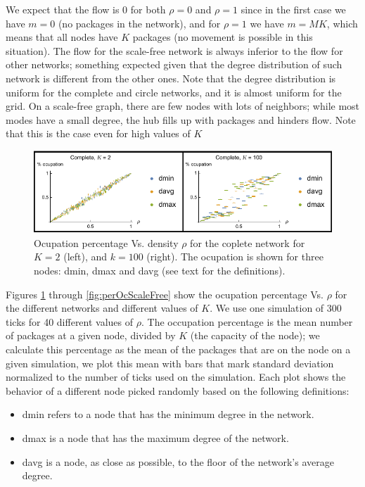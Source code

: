 \documentclass[12pt]{article}
\begin{document}
We expect that the flow is 0 for both $\rho = 0$ and $\rho =1$ since in the first case we have $m=0$ (no packages in the network), and for $\rho = 1$ we have $m = M K$, which means that all nodes have $K$ packages (no movement is possible in this situation).
The flow for the scale-free network is always inferior to the flow for other networks; something expected given that the degree distribution of such network is different from the other ones.
Note that the degree distribution is uniform for the complete and circle networks, and it is almost uniform for the grid.
On a scale-free graph, there are few nodes with lots of neighbors; while most modes have a small degree, the hub fills up with packages and hinders flow.
Note that this is the case even for high values of $K$

\begin{figure}[!hbt]
  \centering
  \includegraphics[width=\textwidth]{plots/ocupationVarianceComplet.pdf}
  \caption{Ocupation percentage Vs. density $\rho$ for the coplete network for $K=2$ (left), and $k=100$ (right). 
    The ocupation is shown for three nodes: dmin, dmax and davg (see text for the definitions).}
  \label{fig:perOcComplete}
\end{figure}

Figures \ref{fig:perOcComplete} through \ref{fig:perOcScaleFree} show the ocupation percentage Vs. $\rho$ for the different networks and different values of $K$.
We use one simulation of 300 ticks for 40 different values of $\rho$.
The occupation percentage is the mean number of packages at a given node, divided by $K$ (the capacity of the node); we calculate this percentage as the mean of the packages that are on the node on a given simulation, we plot this mean with bars that mark standard deviation normalized to the number of ticks used on the simulation.
Each plot shows the behavior of a different node picked randomly based on the following definitions:
\begin{itemize}
\item dmin refers to a node that has the minimum degree in the network.
\item dmax is a node that has the maximum degree of the network.
\item davg is a node, as close as possible, to the floor of the network's average degree.
\end{itemize}
\end{document}
